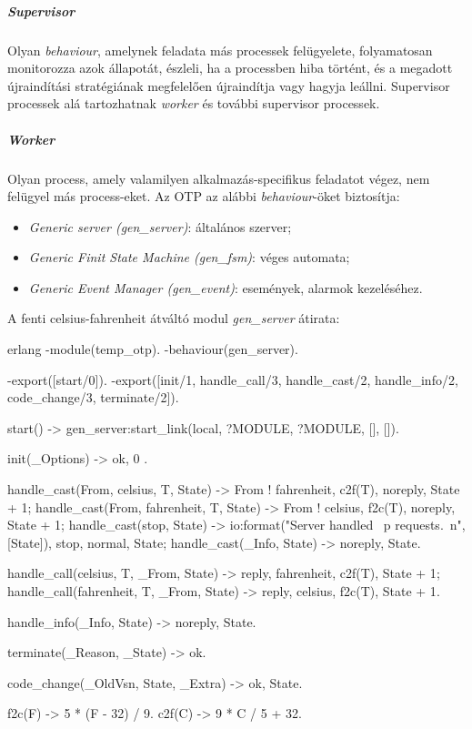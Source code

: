 \documentclass[12pt, a4paper, oneside]{book}
\begin{document}
\subparagraph{Supervisor} Olyan \emph{behaviour}, amelynek feladata más processek
felügyelete, folyamatosan monitorozza azok állapotát, észleli, ha
a processben hiba történt, és a megadott újraindítási stratégiának megfelelően
újraindítja vagy hagyja leállni. Supervisor processek alá tartozhatnak
\emph{worker} és további supervisor processek.

\subparagraph{Worker} Olyan process, amely valamilyen alkalmazás-specifikus
feladatot végez, nem felügyel más process-eket. Az OTP az alábbi
\emph{behaviour}-öket biztosítja:
\begin{itemize}
\item \emph{Generic server (gen\_server)}: általános szerver;
\item \emph{Generic Finit State Machine (gen\_fsm)}: véges automata;
\item \emph{Generic Event Manager (gen\_event)}: események, alarmok kezeléséhez.
\end{itemize}

\newpage
A fenti celsius-fahrenheit átváltó modul \emph{gen\_server} átirata:

\begin{code}{erlang}{}
-module(temp_otp).
-behaviour(gen_server).

-export([start/0]).
-export([init/1, handle_call/3, handle_cast/2, 
         handle_info/2, code_change/3, terminate/2]).

start() ->
  gen_server:start_link({local, ?MODULE}, ?MODULE, [], []).

init(_Options) ->
  {ok, 0 }.

handle_cast({From, celsius, T}, State) ->
  From ! {fahrenheit, c2f(T)},
  {noreply, State + 1};
handle_cast({From, fahrenheit, T}, State) ->
  From ! {celsius, f2c(T)},
  {noreply, State + 1};
handle_cast(stop, State) ->
  io:format("Server handled ~p requests.~n", [State]),
  {stop, normal, State};
handle_cast(_Info, State) ->
  {noreply, State}.

handle_call({celsius, T}, _From, State) ->
  {reply, {fahrenheit, c2f(T)}, State + 1};
handle_call({fahrenheit, T}, _From, State) ->
  {reply, {celsius, f2c(T)}, State + 1}.

handle_info(_Info, State) ->
  {noreply, State}.

terminate(_Reason, _State) ->
  ok.

code_change(_OldVsn, State, _Extra) ->
  {ok, State}.

f2c(F) ->
  5 * (F - 32) / 9.
c2f(C) ->
  9 * C / 5 + 32.
\end{code}
\end{document}
